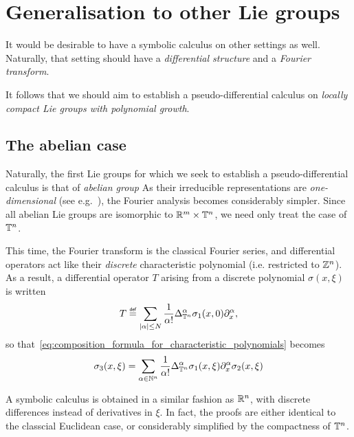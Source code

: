 \section{Generalisation to other Lie groups}

It would be desirable to have a symbolic calculus on other settings as well.
Naturally, that setting should have a \emph{differential structure} and a \emph{Fourier transform}.

It follows that we should aim to establish a pseudo-differential calculus on \emph{locally compact Lie groups with polynomial growth}.

\subsection{The abelian case}

Naturally, the first Lie groups for which we seek to establish a pseudo-differential calculus is that of \emph{abelian group}
As their irreducible representations are \emph{one-dimensional} (see e.g.~\cite[Corollary 6.3.26]{RuzhanskyTurunen10}),
the Fourier analysis becomes considerably simpler.
Since all abelian Lie groups are isomorphic to $\mathbb{R}^m \times \mathbb{T}^n$,
we need only treat the case of $\mathbb{T}^n$.

This time,
the Fourier transform is the classical Fourier series,
and differential operators act like their \emph{discrete} characteristic polynomial (i.e. restricted to $\mathbb{Z}^n$).
As a result,
a differential operator $T$ arising from a discrete polynomial $\sigma(x, \xi)$ is written
\begin{align*}
    T \defeq \sum_{\abs \alpha \leq N} \frac 1 {\alpha!} \DifferenceOperatorOrder [\T^n] \alpha \sigma_1(x, 0) \iD{x^\alpha},
\end{align*}
so that~\eqref{eq:composition_formula_for_characteristic_polynomials} becomes
\begin{align}
    \sigma_3(x, \xi) = \sum_{\alpha \in \N^n} \frac 1 {\alpha!} \DifferenceOperatorOrder [\T^n] \alpha \sigma_1(x, \xi) \iD{x^\alpha} \sigma_2(x, \xi)
    \label{eq:composition_formula_for_discrete_characteristic_polynomials}
\end{align}

A symbolic calculus is obtained in a similar fashion as $\mathbb{R}^n$,
with discrete differences instead of derivatives in $\xi$.
In fact, the proofs are either identical to the classcial Euclidean case,
or considerably simplified by the compactness of $\mathbb{T}^n$.

